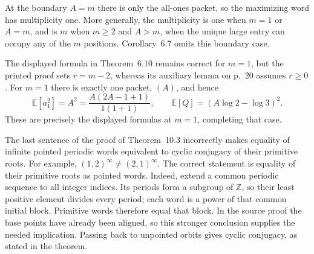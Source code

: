 \begin{sourceissue}
At the boundary $A=m$ there is only the all-ones packet, so the maximizing
word has multiplicity one.  More generally, the multiplicity is one when
$m=1$ or $A=m$, and is $m$ when $m\ge2$ and $A>m$, when the unique large
entry can occupy any of the $m$ positions.
Corollary~6.7 omits this boundary case.
\end{sourceissue}

\begin{sourceissue}[The $m=1$ proof boundary, physical pp.~21--23]
\label{issue:affine-singleton-average}
The displayed formula in Theorem~6.10 remains correct for $m=1$, but the
printed proof sets $r=m-2$, whereas its auxiliary lemma on p.~20 assumes
$r\ge0$.  For $m=1$ there is exactly one packet, $(A)$, and hence
\[
 \mathbb E[a_1^2]=A^2=\frac{A(2A-1+1)}{1(1+1)},\qquad
 \mathbb E[Q]=(A\log2-\log3)^2.
\]
These are precisely the displayed formulas at $m=1$, completing that case.
\end{sourceissue}

\begin{sourceissue}
\label{issue:affine-pointed-words}
The last sentence of the proof of Theorem~10.3 incorrectly makes equality
of infinite pointed periodic words equivalent to cyclic conjugacy of their
primitive roots.  For example, $(1,2)^\infty\ne(2,1)^\infty$.
The correct statement is equality of their primitive roots as pointed words.
Indeed, extend a common periodic sequence to all integer indices.  Its
periods form a subgroup of $\mathbb Z$, so their least positive element
divides every period; each word is a power of that common initial block.
Primitive words therefore equal that block.  In the source proof the base
points have already been aligned, so this stronger conclusion supplies the
needed implication.  Passing back to unpointed orbits gives cyclic conjugacy,
as stated in the theorem.
\end{sourceissue}

